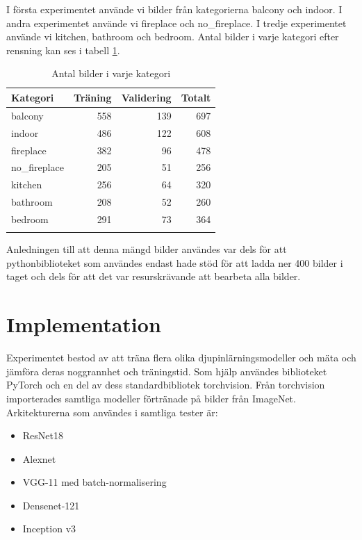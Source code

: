 \documentclass[]{kththesis}
\begin{document}
I första experimentet använde vi bilder från kategorierna balcony och indoor. I andra experimentet använde vi fireplace och no\_fireplace. I tredje experimentet använde vi kitchen, bathroom och bedroom. Antal bilder i varje kategori efter rensning kan ses i tabell \ref{table:amount_images}.

\begin{table}
  \caption{Antal bilder i varje kategori}
  \centering
  \begin{tabular}{ lrrr }
  Kategori & Träning & Validering & Totalt \\  
  \hline
  balcony       & 558 & 139 & 697 \\ 
  indoor        & 486 & 122 & 608 \\ 
  fireplace     & 382 &  96 & 478 \\ 
  no\_fireplace & 205 &  51 & 256 \\
  kitchen       & 256 &  64 & 320 \\
  bathroom      & 208 &  52 & 260 \\ 
  bedroom       & 291 &  73 & 364 \\ 
  \hline
  \label{table:amount_images}
  \end{tabular}
\end{table}

Anledningen till att denna mängd bilder användes var dels för att pythonbiblioteket som användes endast hade stöd för att ladda ner 400 bilder i taget och dels för att det var resurskrävande att bearbeta alla bilder.

\section{Implementation}
Experimentet bestod av att träna flera olika djupinlärningsmodeller och mäta och jämföra deras noggrannhet och träningstid. Som hjälp användes bib\-liotek\-et PyTorch \parencite{paszke2017automatic} och en del av dess standardbibliotek torchvision. Från torchvision importerades samtliga modeller förtränade på bilder från Image\-Net. Arki\-tekt\-urer\-na som användes i samtliga tester är:
\begin{itemize}
  \item ResNet18
  \item Alexnet
  \item VGG-11 med batch-normalisering
  \item Densenet-121
  \item Inception v3
\end{itemize}
\end{document}
